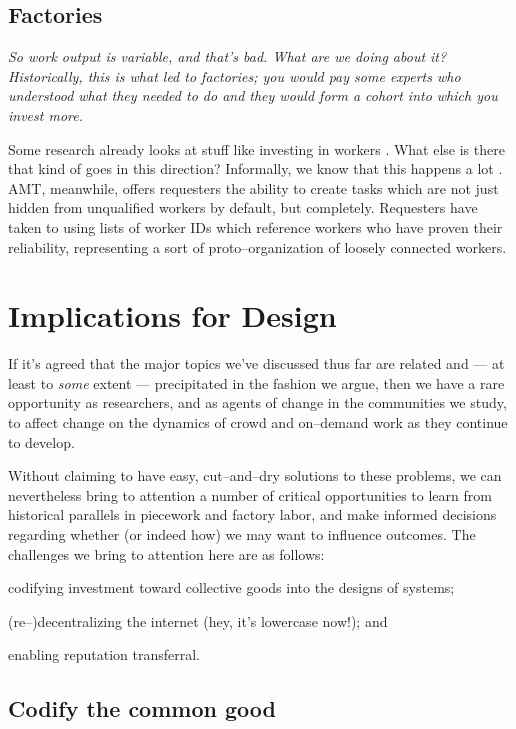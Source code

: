 \documentclass{sigchi}
\begin{document}
\subsection{Factories}\label{sec:Factorization}

\itshape
So work output is variable, and that's bad. What are we doing about it?
Historically, this is what led to factories; you would pay some experts who understood what they needed to do
and they would form a cohort into which you invest more.

Some research already looks at stuff like investing in workers
\cite{shepherdingDow}.
What else is there that kind of goes in this direction?
Informally, we know that this happens a lot
\cite{jonBrelig}.
AMT, meanwhile, offers requesters the ability to create tasks which are
not just hidden from unqualified workers by default, but completely.
Requesters have taken to using lists of worker IDs which reference
workers who have proven their reliability,
representing a sort of proto--organization of loosely connected workers.
\upshape



\section{Implications for Design}
If it's agreed that
the major topics we've discussed thus far are related and
--- at least to \textit{some} extent ---
precipitated in the fashion we argue,
then we have a rare opportunity as researchers,
and as agents of change in the communities we study,
to affect change on the dynamics of crowd and on--demand work
as they continue to develop.

Without claiming to have easy, cut--and--dry solutions to these problems,
we can nevertheless bring to attention a number of critical opportunities to
learn from historical parallels in piecework and factory labor,
and make informed decisions regarding whether
(or indeed how)
we may want to influence outcomes.
The challenges we bring to attention here are as follows:
\begin{inlinelist}
  \item codifying investment toward collective goods into the designs of systems;
  \item (re--)decentralizing the internet (hey, it's lowercase now!); and
  \item enabling reputation transferral.
\end{inlinelist}


\subsection{Codify the common good}
\end{document}
